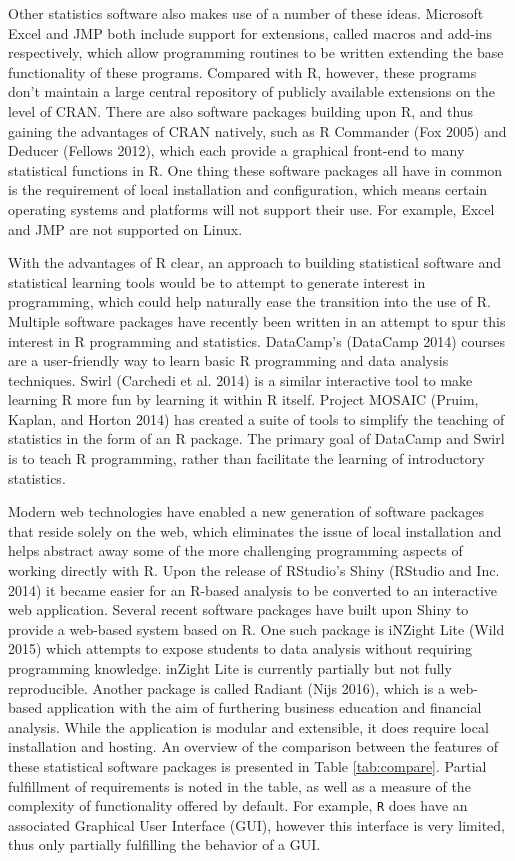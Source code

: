 \documentclass[12pt,]{article}
\begin{document}
Other statistics software also makes use of a number of these ideas.
Microsoft Excel and JMP both include support for extensions, called
macros and add-ins respectively, which allow programming routines to be
written extending the base functionality of these programs. Compared
with R, however, these programs don't maintain a large central
repository of publicly available extensions on the level of CRAN. There
are also software packages building upon R, and thus gaining the
advantages of CRAN natively, such as R Commander (Fox 2005) and Deducer
(Fellows 2012), which each provide a graphical front-end to many
statistical functions in R. One thing these software packages all have
in common is the requirement of local installation and configuration,
which means certain operating systems and platforms will not support
their use. For example, Excel and JMP are not supported on Linux.

With the advantages of R clear, an approach to building statistical
software and statistical learning tools would be to attempt to generate
interest in programming, which could help naturally ease the transition
into the use of R. Multiple software packages have recently been written
in an attempt to spur this interest in R programming and statistics.
DataCamp's (DataCamp 2014) courses are a user-friendly way to learn
basic R programming and data analysis techniques. Swirl (Carchedi et al.
2014) is a similar interactive tool to make learning R more fun by
learning it within R itself. Project MOSAIC (Pruim, Kaplan, and Horton
2014) has created a suite of tools to simplify the teaching of
statistics in the form of an R package. The primary goal of DataCamp and
Swirl is to teach R programming, rather than facilitate the learning of
introductory statistics.

Modern web technologies have enabled a new generation of software
packages that reside solely on the web, which eliminates the issue of
local installation and helps abstract away some of the more challenging
programming aspects of working directly with R. Upon the release of
RStudio's Shiny (RStudio and Inc. 2014) it became easier for an R-based
analysis to be converted to an interactive web application. Several
recent software packages have built upon Shiny to provide a web-based
system based on R. One such package is iNZight Lite (Wild 2015) which
attempts to expose students to data analysis without requiring
programming knowledge. inZight Lite is currently partially but not fully
reproducible. Another package is called Radiant (Nijs 2016), which is a
web-based application with the aim of furthering business education and
financial analysis. While the application is modular and extensible, it
does require local installation and hosting. An overview of the
comparison between the features of these statistical software packages
is presented in Table \ref{tab:compare}. Partial fulfillment of
requirements is noted in the table, as well as a measure of the
complexity of functionality offered by default. For example, \texttt{R}
does have an associated Graphical User Interface (GUI), however this
interface is very limited, thus only partially fulfilling the behavior
of a GUI.
\end{document}
